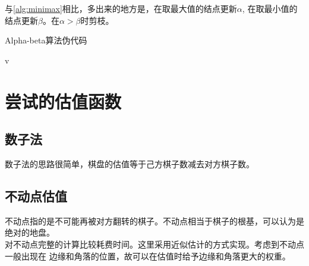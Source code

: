\documentclass[a4paper]{article}
\begin{document}
与\autoref{alg:minimax}相比，多出来的地方是，在取最大值的结点更新$\alpha$,
在取最小值的结点更新$\beta$。在$\alpha > \beta$时剪枝。
\begin{algorithm}
\caption{Alpha-beta算法伪代码}
\label{alg:abtrunc}
\begin{algorithmic}[2]
            \State {}
        \EndIf
                \If {$\alpha > \beta$}
                \EndIf
            \EndFor
        \Else
                \If {$\alpha > \beta$}
                \EndIf
            \EndFor
        \EndIf
        \State \Return v
    \EndFunction
    \State {}
    \State {}\label{alg:line:callabtrunc}
\end{algorithmic}
\end{algorithm}

\section{尝试的估值函数}
\subsection{数子法}
数子法的思路很简单，棋盘的估值等于己方棋子数减去对方棋子数。
\subsection{不动点估值}
不动点指的是不可能再被对方翻转的棋子。不动点相当于棋子的根基，可以认为是绝对的地盘。\\

对不动点完整的计算比较耗费时间。这里采用近似估计的方式实现。考虑到不动点一般出现在
边缘和角落的位置，故可以在估值时给予边缘和角落更大的权重。\\
\end{document}
